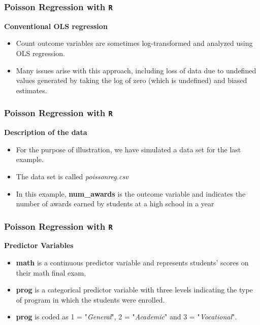 \documentclass[MASTER.tex]{subfiles}
\begin{document}
\begin{frame}[fragile]
	
	\frametitle{Poisson Regression with \texttt{R}}
	\Large
	\textbf{Conventional OLS regression}
	\begin{itemize}
		\item Count outcome variables are sometimes log-transformed and analyzed using OLS regression. 
		\item Many issues arise with this approach, including loss of data due to undefined values generated by taking the log of zero (which is undefined) and biased estimates.
	\end{itemize}
	\bigskip
\end{frame}


\begin{frame}[fragile]

\frametitle{Poisson Regression with \texttt{R}}
\Large
\textbf{Description of the data}

\begin{itemize}
\item For the purpose of illustration, we have simulated a data set for the last example.

\item The data set is called \textit{poissonreg.csv}  

\item In this example, \textbf{num\_awards} is the outcome variable and indicates the number of awards earned by students at a high school in a year

\end{itemize}
\end{frame}
\begin{frame}[fragile]
	
	\frametitle{Poisson Regression with \texttt{R}}
	\Large
	\textbf{Predictor Variables}
\begin{itemize}
\item \textbf{math} is a continuous predictor variable and represents students' scores on their math final exam, \item \textbf{prog} is a categorical predictor variable with three levels indicating the type of program in which the students were enrolled.

\item  \textbf{prog} is coded as 1 = "\textit{General}",
 2 = "\textit{Academic}" and 3 = "\textit{Vocational}". 
\end{itemize}

\end{frame}
\end{document}
